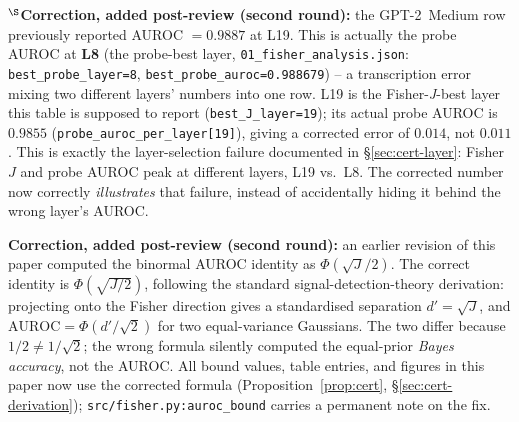 \documentclass[10pt,twocolumn]{article}
\begin{document}
$^\S$\textbf{Correction, added post-review (second round):} the
GPT-2~Medium row previously reported AUROC $= 0.9887$ at L19. This is
actually the probe AUROC at \textbf{L8} (the probe-best layer,
\texttt{01\_fisher\_analysis.json}: \texttt{best\_probe\_layer=8},
\texttt{best\_probe\_auroc=0.988679}) -- a transcription error mixing
two different layers' numbers into one row. L19 is the
Fisher-\emph{J}-best layer this table is supposed to report
(\texttt{best\_J\_layer=19}); its actual probe AUROC is $0.9855$
(\texttt{probe\_auroc\_per\_layer[19]}), giving a corrected error of
$0.014$, not $0.011$. This is exactly the layer-selection failure
documented in \S\ref{sec:cert-layer}: Fisher~$J$ and probe AUROC peak at
different layers, L19 vs.\ L8. The corrected number now correctly
\emph{illustrates} that failure, instead of accidentally hiding it
behind the wrong layer's AUROC.

\textbf{Correction, added post-review (second round):} an earlier
revision of this paper computed the binormal AUROC identity as
$\Phi(\sqrt{J}/2)$. The correct identity is $\Phi(\sqrt{J/2})$,
following the standard signal-detection-theory derivation: projecting
onto the Fisher direction gives a standardised separation $d' =
\sqrt{J}$, and $\text{AUROC} = \Phi(d'/\sqrt{2})$ for two equal-variance
Gaussians. The two differ because $1/2 \neq 1/\sqrt{2}$; the wrong
formula silently computed the equal-prior \emph{Bayes accuracy}, not the
AUROC. All bound values, table entries, and figures in this paper now
use the corrected formula (Proposition~\ref{prop:cert},
\S\ref{sec:cert-derivation}); \texttt{src/fisher.py:auroc\_bound} carries
a permanent note on the fix.
\end{document}
